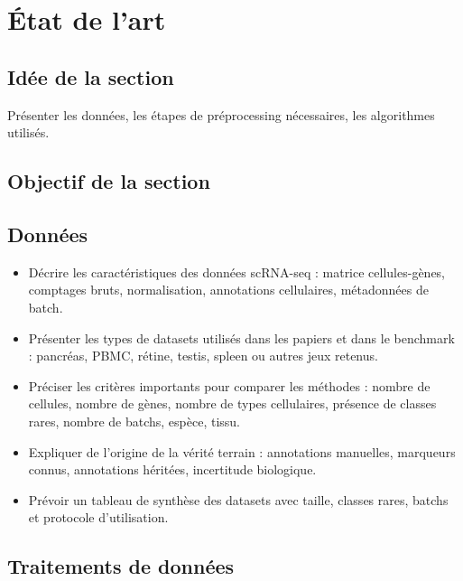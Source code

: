 \section{État de l'art}

\subsection*{Idée de la section  }
Présenter les données, les étapes de préprocessing nécessaires, les algorithmes utilisés.

\subsection*{Objectif de la section}

\subsection{Données}
\begin{itemize}
  \item Décrire les caractéristiques des données scRNA-seq : matrice cellules-gènes, comptages bruts, normalisation, annotations cellulaires, métadonnées de batch.
  \item Présenter les types de datasets utilisés dans les papiers et dans le benchmark : pancréas, PBMC, rétine, testis, spleen ou autres jeux retenus.
  \item Préciser les critères importants pour comparer les méthodes : nombre de cellules, nombre de gènes, nombre de types cellulaires, présence de classes rares, nombre de batchs, espèce, tissu.
  \item Expliquer de l'origine de la vérité terrain : annotations manuelles, marqueurs connus, annotations héritées, incertitude biologique.
  \item Prévoir un tableau de synthèse des datasets avec taille, classes rares, batchs et protocole d'utilisation.
\end{itemize}

\subsection{Traitements de données}

